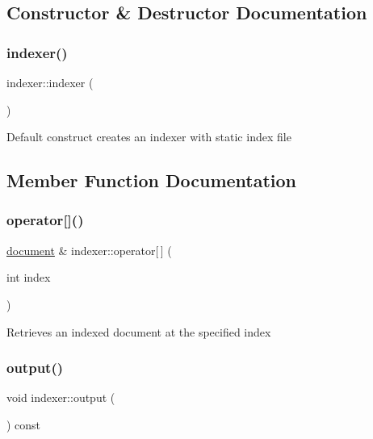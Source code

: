 \subsection{Constructor \& Destructor Documentation}
\mbox{\label{classindexer_acbbcbad080a7ae43ed78840fcf006960}} 
\subsubsection{\texorpdfstring{indexer()}{indexer()}}
{\footnotesize\ttfamily indexer\+::indexer (\begin{DoxyParamCaption}{ }\end{DoxyParamCaption})}

Default construct creates an indexer with static index file 

\subsection{Member Function Documentation}
\mbox{\label{classindexer_a1ef6a5497d341fdbbae13bb26a66c37a}} 
\subsubsection{\texorpdfstring{operator[]()}{operator[]()}}
{\footnotesize\ttfamily \hyperlink{classdocument}{document} \& indexer\+::operator\mbox{[}$\,$\mbox{]} (\begin{DoxyParamCaption}\item[{int}]{index }\end{DoxyParamCaption})}

Retrieves an indexed document at the specified index \mbox{\label{classindexer_af84f1ddc60859b7d007699ee011abf36}} 
\subsubsection{\texorpdfstring{output()}{output()}}
{\footnotesize\ttfamily void indexer\+::output (\begin{DoxyParamCaption}{ }\end{DoxyParamCaption}) const}

